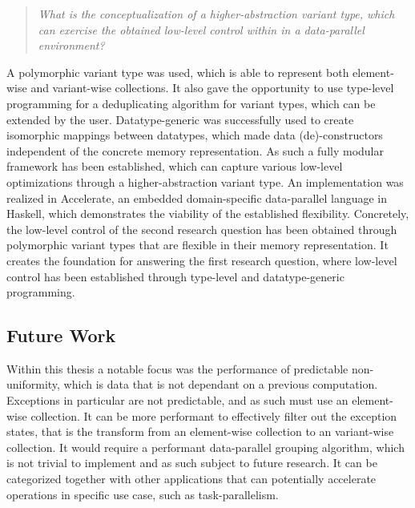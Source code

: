 \documentclass{article}
\begin{document}
\begin{quote}
{\it What is the conceptualization of a higher-abstraction variant type, which can exercise the obtained low-level control within in a data-parallel environment?}
\end{quote}

A polymorphic variant type was used, which is able to represent both element-wise and variant-wise collections.
It also gave the opportunity to use type-level programming for a deduplicating algorithm for variant types, which can be extended by the user.
Datatype-generic was successfully used to create isomorphic mappings between datatypes, which made data (de)-constructors independent of the concrete memory representation.
As such a fully modular framework has been established, which can capture various low-level optimizations through a higher-abstraction variant type.
An implementation was realized in Accelerate, an embedded domain-specific data-parallel language in Haskell, which demonstrates the viability of the established flexibility.
Concretely, the low-level control of the second research question has been obtained through polymorphic variant types that are flexible in their memory representation.
It creates the foundation for answering the first research question, where low-level control has been established through type-level and datatype-generic programming. 


\subsection{Future Work}

Within this thesis a notable focus was the performance of predictable non-uniformity, which is data that is not dependant on a previous computation.
Exceptions in particular are not predictable, and as such must use an element-wise collection.
It can be more performant to effectively filter out the exception states, that is the transform from an element-wise collection to an variant-wise collection.
It would require a performant data-parallel grouping algorithm, which is not trivial to implement and as such subject to future research.
It can be categorized together with other applications that can potentially accelerate operations in specific use case, such as task-parallelism. 

\newpage



\end{document}
